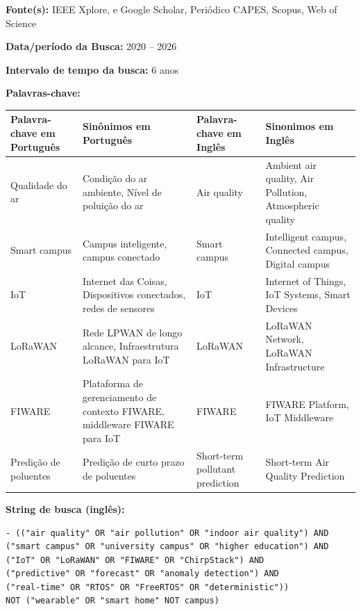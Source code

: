 \vspace{0.5cm}
\noindent \textbf{Fonte(s):} IEEE Xplore, e Google Scholar, Periódico CAPES, Scopus, Web of Science

\vspace{0.5cm}
\noindent \textbf{Data/período da Busca:} 2020 -- 2026

\vspace{0.5cm}
\noindent \textbf{Intervalo de tempo da busca:} 6 anos

\newpage
\vspace{0.5cm}
\noindent \textbf{Palavras-chave:}
\vspace{0.3cm}

\begin{table}[H]
\centering
\begin{tabular}{|p{4 cm}|p{4 cm}|p{4 cm}|p{4 cm}|}
\hline
\textbf{Palavra-chave em Português}
& \textbf{Sinônimos em Português}
& \textbf{Palavra-chave em Inglês}
& \textbf{Sinonimos em Inglês}\\
\hline
Qualidade do ar
& Condição do ar ambiente, Nível de poluição do ar
& Air quality
& Ambient air quality, Air Pollution, Atmospheric quality\\
\hline
Smart campus
& Campus inteligente, campus conectado
& Smart campus
& Intelligent campus, Connected campus, Digital campus\\
\hline
IoT
& Internet das Coisas, Dispositivos conectados, redes de sensores
& IoT
& Internet of Things, IoT Systems, Smart Devices\\
\hline
LoRaWAN
& Rede LPWAN de longo alcance, Infraestrutura LoRaWAN para IoT
& LoRaWAN
& LoRaWAN Network, LoRaWAN Infrastructure\\
\hline
FIWARE
& Plataforma de gerenciamento de contexto FIWARE, middleware FIWARE para IoT
& FIWARE
& FIWARE Platform, IoT Middleware\\
\hline
Predição de poluentes
& Predição de curto prazo de poluentes
& Short-term pollutant prediction
& Short-term Air Quality Prediction\\
\hline
\end{tabular}
\end{table}

\vspace{0.5cm}
\noindent \textbf{String de busca (inglês):}
\begin{verbatim}
- (("air quality" OR "air pollution" OR "indoor air quality") AND
("smart campus" OR "university campus" OR "higher education") AND
("IoT" OR "LoRaWAN" OR "FIWARE" OR "ChirpStack") AND
("predictive" OR "forecast" OR "anomaly detection") AND
("real-time" OR "RTOS" OR "FreeRTOS" OR "deterministic"))
NOT ("wearable" OR "smart home" NOT campus)
\end{verbatim}

